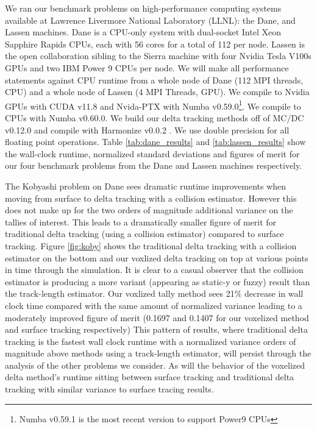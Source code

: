 We ran our benchmark problems on high-performance computing systems available at Lawrence Livermore National Laboratory (LLNL): the Dane, and Lassen machines.
Dane is a CPU-only system with dual-socket Intel Xeon Sapphire Rapids CPUs, each with 56 cores for a total of 112 per node. 
Lassen is the open collaboration sibling to the Sierra machine with four Nvidia Tesla V100s GPUs and two IBM Power 9 CPUs per node.
We will make all performance statements against CPU runtime from a whole node of Dane (112 MPI threads, CPU) and a whole node of Lassen (4 MPI Threads, GPU).
We compile to Nvidia GPUs with CUDA v11.8 and
Nvida-PTX with Numba v0.59.0\footnote{Numba v0.59.1 is the most recent version to support Power9 CPUs}.
We compile to CPUs with Numba v0.60.0.
We build our delta tracking methods off of MC/DC v0.12.0 \cite{transport_cement_mcdc_2024} and compile with Harmonize v0.0.2 \cite{harmonize}.
We use double precision for all floating point operations.
Table \ref{tab:dane_results} and \ref{tab:lassen_results} show the wall-clock runtime, normalized standard deviations and figures of merit for our four benchmark problems from the Dane and Lassen machines respectively.

The Kobyashi problem on Dane sees dramatic runtime improvements when moving from surface to delta tracking with a collision estimator.
However this does not make up for the two orders of magnitude additional variance on the tallies of interest.
This leads to a dramatically smaller figure of merit for traditional delta tracking (using a collision estimator) compared to surface tracking.
Figure \ref{fig:koby} shows the traditional delta tracking with a collision estimator on the bottom and our voxlized delta tracking on top at various points in time through the simulation.
It is clear to a casual observer that the collision estimator is producing a more variant (appearing as static-y or fuzzy) result than the track-length estimator.
Our voxlized tally method sees 21\% decrease in wall clock time compared with the same amount of normalized variance leading to a moderately improved figure of merit (\num{0.1697} and \num{0.1407} for our voxelized method and surface tracking respectively) 
This pattern of results, where traditional delta tracking is the fastest wall clock runtime with a normalized variance orders of magnitude above methods using a track-length estimator, will persist through the analysis of the other problems we consider.
As will the behavior of the voxelized delta method's runtime sitting between surface tracking and traditional delta tracking with similar variance to surface tracing results.


